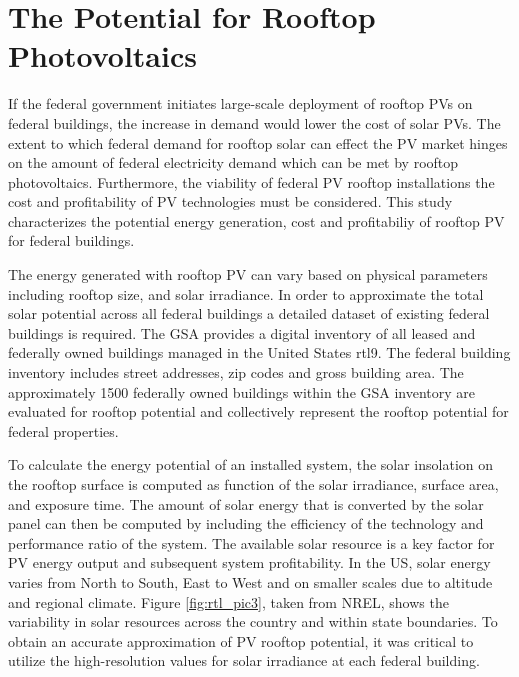 \section{The Potential for Rooftop Photovoltaics}
\par
 If the federal government initiates large-scale deployment of rooftop PVs on federal buildings, the increase in demand would lower the cost of solar PVs. The extent to which federal demand for rooftop solar can effect the PV market hinges on the amount of federal electricity demand which can be met by rooftop photovoltaics. Furthermore, the viability of federal PV rooftop installations the cost and profitability of PV technologies must be considered. This study characterizes the potential energy generation, cost and profitabiliy of rooftop PV for federal buildings.

The energy generated with rooftop PV can vary based on physical parameters including rooftop size, and solar irradiance.  In order to approximate the total solar potential across all federal buildings a detailed dataset of existing federal buildings is required. The GSA provides a digital inventory of all leased and federally owned buildings managed in the United States \cite{roisin}{rtl9}. The federal building inventory includes street addresses, zip codes and gross building area. The approximately 1500 federally owned buildings within the GSA inventory are evaluated for rooftop potential and collectively represent the rooftop potential for federal properties.

\par
To calculate the energy potential of an installed system, the solar insolation on the rooftop surface is computed as function of the solar irradiance, surface area, and exposure time. The amount of solar energy that is converted by the solar panel can then be computed by including the efficiency of the technology and performance ratio of the system. The available solar resource is a key factor for PV energy output and subsequent system profitability. In the US, solar energy varies from North to South, East to West and on smaller scales due to altitude and regional climate. Figure \ref{fig:rtl_pic3}, taken from NREL, shows the variability in solar resources across the country and within state boundaries.  To obtain an accurate approximation of PV rooftop potential, it was critical to utilize the high-resolution values for solar irradiance at each federal building. 

